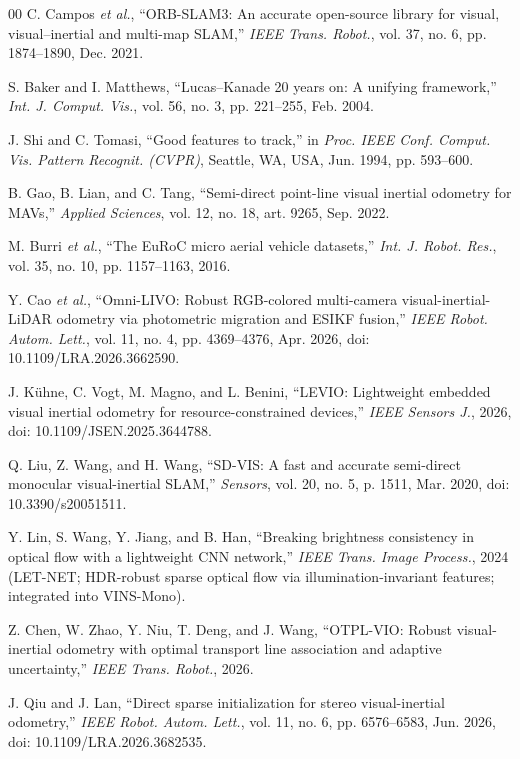 \documentclass[letterpaper,journal]{IEEEtran}
\begin{document}
\begin{thebibliography}{00}
 C. Campos \emph{et al.}, ``ORB-SLAM3: An accurate open-source library for visual, visual--inertial and multi-map SLAM,'' \emph{IEEE Trans. Robot.}, vol. 37, no. 6, pp. 1874--1890, Dec. 2021.

 S. Baker and I. Matthews, ``Lucas--Kanade 20 years on: A unifying framework,'' \emph{Int. J. Comput. Vis.}, vol. 56, no. 3, pp. 221--255, Feb. 2004.

 J. Shi and C. Tomasi, ``Good features to track,'' in \emph{Proc. IEEE Conf. Comput. Vis. Pattern Recognit. (CVPR)}, Seattle, WA, USA, Jun. 1994, pp. 593--600.

 B. Gao, B. Lian, and C. Tang, ``Semi-direct point-line visual inertial odometry for MAVs,'' \emph{Applied Sciences}, vol. 12, no. 18, art. 9265, Sep. 2022.

 M. Burri \emph{et al.}, ``The EuRoC micro aerial vehicle datasets,'' \emph{Int. J. Robot. Res.}, vol. 35, no. 10, pp. 1157--1163, 2016.

 Y. Cao \emph{et al.}, ``Omni-LIVO: Robust RGB-colored multi-camera visual-inertial-LiDAR odometry via photometric migration and ESIKF fusion,'' \emph{IEEE Robot. Autom. Lett.}, vol. 11, no. 4, pp. 4369--4376, Apr. 2026, doi: 10.1109/LRA.2026.3662590.

 J. K\"uhne, C. Vogt, M. Magno, and L. Benini, ``LEVIO: Lightweight embedded visual inertial odometry for resource-constrained devices,'' \emph{IEEE Sensors J.}, 2026, doi: 10.1109/JSEN.2025.3644788.

 Q. Liu, Z. Wang, and H. Wang, ``SD-VIS: A fast and accurate semi-direct monocular visual-inertial SLAM,'' \emph{Sensors}, vol. 20, no. 5, p. 1511, Mar. 2020, doi: 10.3390/s20051511.

 Y. Lin, S. Wang, Y. Jiang, and B. Han, ``Breaking brightness consistency in optical flow with a lightweight CNN network,'' \emph{IEEE Trans. Image Process.}, 2024 (LET-NET; HDR-robust sparse optical flow via illumination-invariant features; integrated into VINS-Mono).

 Z. Chen, W. Zhao, Y. Niu, T. Deng, and J. Wang, ``OTPL-VIO: Robust visual-inertial odometry with optimal transport line association and adaptive uncertainty,'' \emph{IEEE Trans. Robot.}, 2026.

 J. Qiu and J. Lan, ``Direct sparse initialization for stereo visual-inertial odometry,'' \emph{IEEE Robot. Autom. Lett.}, vol. 11, no. 6, pp. 6576--6583, Jun. 2026, doi: 10.1109/LRA.2026.3682535.

\end{thebibliography}
\end{document}
